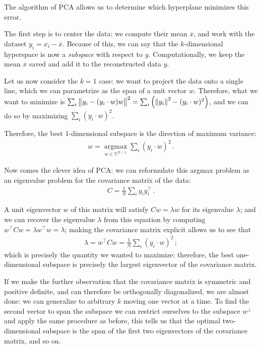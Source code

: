 \documentclass[main.tex]{subfiles}
\begin{document}
The algorithm of PCA allows us to determine which hyperplane minimizes this error. 

The first step is to center the data: we compute their mean \(\overline{x}\), and work with the dataset \(y_i = x_i - \overline{x}\). 
Because of this, we can say that the \(k\)-dimensional hyperspace is now a \emph{subspace} with respect to \(y\). 
Computationally, we keep the mean \(\overline{x}\) saved and add it to the reconstructed data \(y\). 

Let us now consider the \(k=1\) case: we want to project the data onto a single line, which we can parametrize as the span of a unit vector \(w\).
Therefore, what we want to minimize is \(\sum _{i} \norm{y_i - (y_i \cdot w) w}^2 = \sum _{i} \qty( \norm{y_i}^2 - (y_i \cdot w)^2)\), and we can do so by maximizing \(\sum _{i} (y_i \cdot w)^2\). 

Therefore, the best 1-dimensional subspace is the direction of maximum variance: 
%
\begin{align}
w = \underset{w \in \mathbb{S}^{D-1}}{\operatorname{argmax}} \sum _{i} (y_i \cdot w)^2
\,.
\end{align}
%

Now comes the clever idea of \ac{PCA}: we can reformulate this argmax problem as an eigenvalue problem for the covariance matrix of the data: 
%
\begin{align}
C = \frac{1}{N} \sum _{i} y_i y_i^{\top}
\,.
\end{align}

A unit eigenvector \(w\) of this matrix will satisfy \(Cw = \lambda w\) for its eigenvalue \(\lambda \); and we can recover the eigenvalue \(\lambda\) from this equation by computing \(w^{\top} C w = \lambda w^{\top} w = \lambda \); making the covariance matrix explicit allows us to see that 
%
\begin{align}
\lambda = w^{\top} C w =  \frac{1}{N }\sum _{i} (y_i \cdot w)^2
\,;
\end{align}
%
which is precisely the quantity we wanted to maximize: therefore, the best one-dimensional subspace is precisely the largest eigenvector of the covariance matrix. 

If we make the further observation that the covariance matrix is symmetric and positive definite, and can therefore be orthogonally diagonalized, we are almost done: we can generalize to arbitrary \(k\) moving one vector at a time. 
To find the second vector to span the subspace we can restrict ourselves to the subspace \(w^{\perp}\) and apply the same procedure as before, this tells us that the optimal two-dimensional subspace is the span of the first two eigenvectors of the covariance matrix, and so on. 
\end{document}
